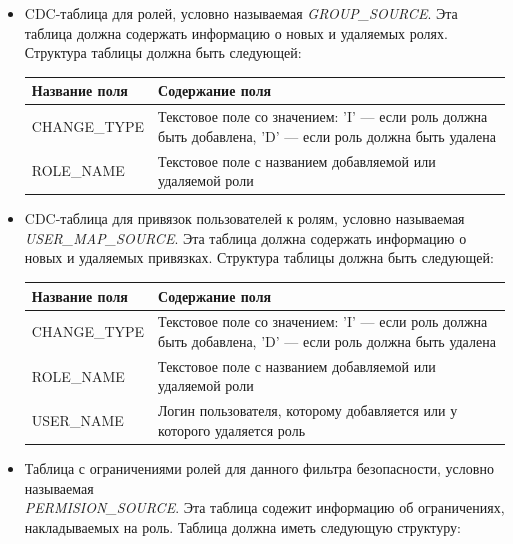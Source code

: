 \documentclass[../user-manual.tex]{subfiles}
\begin{document}
	\begin{itemize}
		\item CDC-таблица для ролей, условно называемая \textit{GROUP\_SOURCE}. Эта таблица должна содержать информацию о новых и удаляемых ролях. Структура таблицы должна быть следующей:
	
		\begin{center}
			\begin{tabular}{|l|p{}|}
				\hline
				Название поля & Содержание поля \\
				\hline
				CHANGE\_TYPE & Текстовое поле со значением: \newline 
				'I' --- если роль должна быть добавлена, 'D' --- если роль должна быть удалена \\
				\hline
				ROLE\_NAME & Текстовое поле с названием добавляемой или удаляемой роли \\
				\hline
			\end{tabular}
		\end{center}
	
		\item CDC-таблица для привязок пользователей к ролям, условно называемая \textit{USER\_MAP\_SOURCE}. Эта таблица должна содержать информацию о новых и удаляемых привязках. Структура таблицы должна быть следующей:
		
		\begin{center}
			\begin{tabular}{|l|p{}|}
				\hline
				Название поля & Содержание поля \\
				\hline
				CHANGE\_TYPE & Текстовое поле со значением: \newline 
				'I' --- если роль должна быть добавлена, 'D' --- если роль должна быть удалена \\
				\hline
				ROLE\_NAME & Текстовое поле с названием добавляемой или удаляемой роли \\
				\hline
				USER\_NAME & Логин пользователя, которому добавляется или у которого удаляется роль \\
				\hline
			\end{tabular}
		\end{center}		
	
		\item Таблица с ограничениями ролей для данного фильтра безопасности, условно называемая\\ \textit{PERMISION\_SOURCE}. Эта таблица содежит информацию об ограничениях, накладываемых на роль. Таблица должна иметь следующую структуру:
		

\end{itemize}
\end{document}
